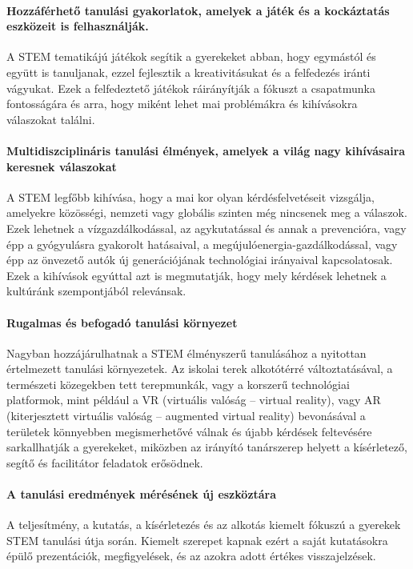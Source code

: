 \paragraph{Hozzáférhető tanulási gyakorlatok, amelyek a játék és a kockáztatás
  eszközeit is felhasználják.} A STEM tematikájú játékok segítik a gyerekeket
abban, hogy egymástól és együtt is tanuljanak, ezzel fejlesztik a
kreativitásukat és a felfedezés iránti vágyukat. Ezek a felfedeztető játékok
ráirányítják a fókuszt a csapatmunka fontosságára és arra, hogy miként lehet
mai problémákra és kihívásokra válaszokat találni.

\paragraph{Multidiszciplináris tanulási élmények, amelyek a világ nagy
  kihívásaira keresnek válaszokat} A STEM legfőbb kihívása, hogy a mai kor olyan
kérdésfelvetéseit vizsgálja, amelyekre közösségi, nemzeti vagy globális
szinten még nincsenek meg a válaszok. Ezek lehetnek a vízgazdálkodással, az
agykutatással és annak a prevencióra, vagy épp a gyógyulásra gyakorolt
hatásaival, a megújulóenergia-gazdálkodással, vagy épp az önvezető autók új
generációjának technológiai irányaival kapcsolatosak. Ezek a kihívások egyúttal
azt is megmutatják, hogy mely kérdések lehetnek a kultúránk szempontjából
relevánsak.

\paragraph{Rugalmas és befogadó tanulási környezet} Nagyban hozzájárulhatnak a
STEM élményszerű tanulásához a nyitottan értelmezett tanulási környezetek. Az
iskolai terek alkotótérré változtatásával, a természeti közegekben tett
terepmunkák, vagy a korszerű technológiai platformok, mint például a VR
(virtuális valóság – virtual reality), vagy AR (kiterjesztett virtuális valóság
– augmented virtual reality) bevonásával a területek könnyebben megismerhetővé
válnak és újabb kérdések feltevésére sarkallhatják a gyerekeket, miközben az
irányító tanárszerep helyett a kísérletező, segítő és facilitátor feladatok
erősödnek.

\paragraph{A tanulási eredmények mérésének új eszköztára} A teljesítmény, a
kutatás, a kísérletezés és az alkotás kiemelt fókuszú a gyerekek STEM tanulási
útja során. Kiemelt szerepet kapnak ezért a saját kutatásokra épülő
prezentációk, megfigyelések, és az azokra adott értékes visszajelzések.

